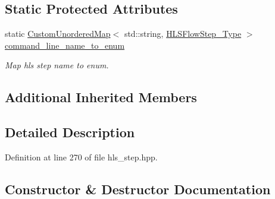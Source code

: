 \subsection*{Static Protected Attributes}
\begin{DoxyCompactItemize}
\item 
static \hyperlink{custom__map_8hpp_ad1ed68f2ff093683ab1a33522b144adc}{Custom\+Unordered\+Map}$<$ std\+::string, \hyperlink{hls__step_8hpp_ada16bc22905016180e26fc7e39537f8d}{H\+L\+S\+Flow\+Step\+\_\+\+Type} $>$ \hyperlink{classHLS__step_aa9ddc4003e136aca4cf28fb01e23e4b7}{command\+\_\+line\+\_\+name\+\_\+to\+\_\+enum}
\begin{DoxyCompactList}\small\item\em Map hls step name to enum. \end{DoxyCompactList}\end{DoxyCompactItemize}
\subsection*{Additional Inherited Members}


\subsection{Detailed Description}


Definition at line 270 of file hls\+\_\+step.\+hpp.



\subsection{Constructor \& Destructor Documentation}
\mbox{\label{classHLS__step_a1c137d0b686b327d00e906ef2f3b1cae}} 
